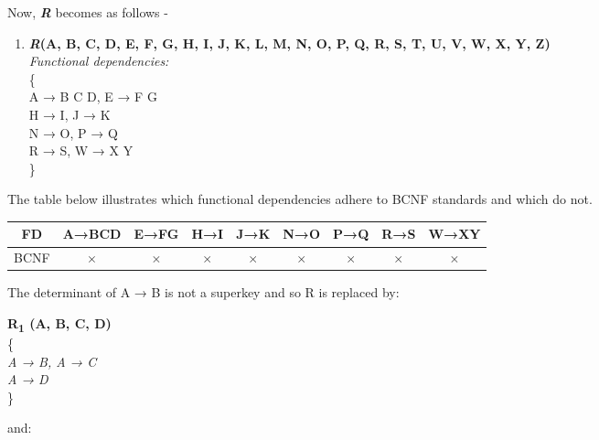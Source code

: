 Now, \textbf{\emph{R}} becomes as follows -\\
\begin{enumerate}
\item \textbf{\emph{R}(A, B, C, D, E, F, G, H, I, J, K, L, M, N, O, P, Q, R, S, T, U, V, W, X, Y, Z)}\\
\textit{Functional dependencies:}\\
\{\\
\hspace{1cm} A → B C D, E → F G\\
\hspace{1cm} H → I, J → K\\
\hspace{1cm} N → O, P → Q\\
\hspace{1cm} R → S, W → X Y\\
\}
\end{enumerate}

The table below illustrates which functional dependencies adhere to BCNF standards and which do not.


\begin{center}

\begin{tabular}{ |c|c|c|c|c|c|c|c|c| }
\hline
 FD&A→BCD&E→FG&H→I&J→K&N→O&P→Q&R→S&W→XY\\ 
\hline
BCNF&$\times$&$\times$&$\times$&$\times$&$\times$&$\times$&$\times$&$\times$ \\ \hline

\end{tabular}
\end{center}

The determinant of A → B is not a superkey and so R is replaced by:\\

\begin{adjustwidth}{2cm}{}
\textbf{R\textsubscript{1} (A, B, C, D)}\\
\{\\ 
\textit{
A → B, A → C\\
A → D\\
} 
\}\\
\end{adjustwidth} 
and:\\ 

